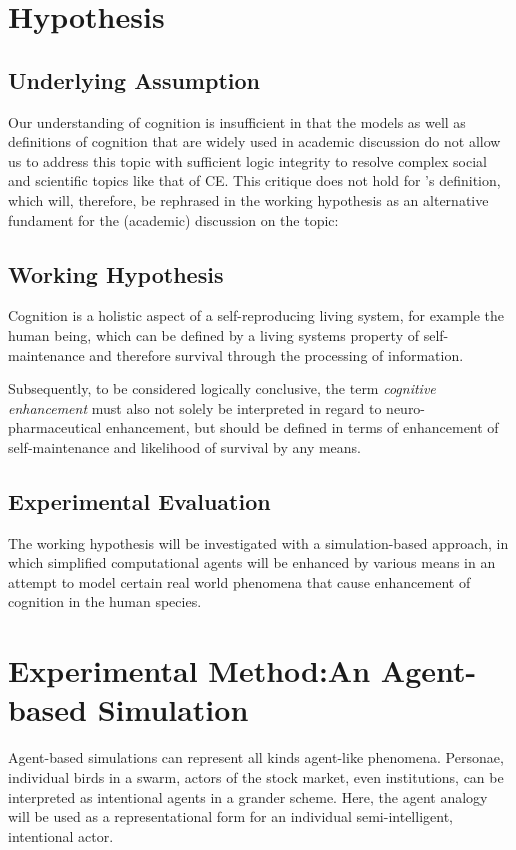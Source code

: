 \chapter{Hypothesis}
\section{Underlying Assumption}
Our understanding of cognition is insufficient in that the models as well as definitions of cognition that are widely used in academic discussion do not allow us to address this topic with sufficient logic integrity to resolve complex social and scientific topics like that of CE. This critique does not hold for \citeauthor{Maturana1980}’s \citeyearpar{Maturana1980} definition, which will, therefore, be rephrased in the working hypothesis  as an alternative fundament for the (academic) discussion on the topic:

\section{Working Hypothesis}
Cognition is a holistic aspect of a self-reproducing living system, for example the human being, which can be defined by a living systems property of self-maintenance and therefore survival through the processing of information. 

Subsequently, to be considered logically conclusive, the term \emph{cognitive enhancement} must also not solely be interpreted in regard to neuro-pharmaceutical enhancement, but should be defined in terms of enhancement of self-maintenance and likelihood of survival by any means.

\section{Experimental Evaluation}
The working hypothesis will be investigated with a simulation-based approach, in which simplified computational agents will be enhanced by various means in an attempt to model certain real world phenomena that cause enhancement of cognition in the human species.

\chapter{Experimental Method:\newline An Agent-based Simulation}
Agent-based simulations can represent all kinds agent-like phenomena. Personae, individual birds in a swarm, actors of the stock market, even institutions, can be interpreted as intentional agents in a grander scheme. Here, the agent analogy will be used as a representational form for an individual semi-intelligent, intentional actor. 

